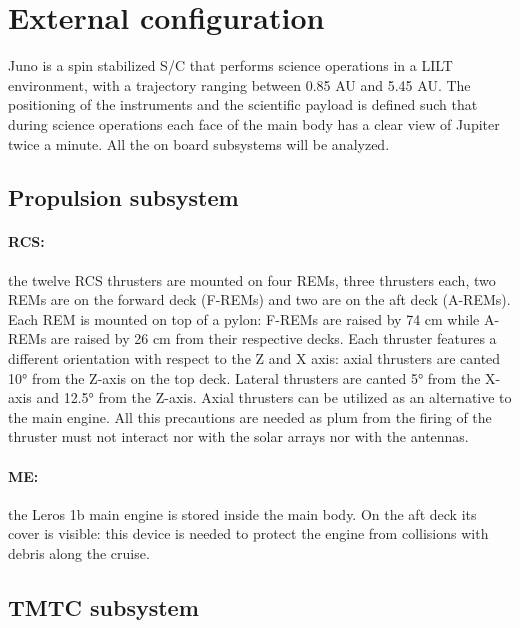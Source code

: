\section{External configuration}
\label{sec:external_config}

Juno is a spin stabilized S/C that performs science operations in a LILT environment, with a trajectory ranging between 0.85 AU and 5.45 AU. The positioning of the instruments and the scientific payload is defined such that during science operations each face of the main body has a clear view of Jupiter twice a minute. All the on board subsystems will be analyzed. 

\subsection{Propulsion subsystem}
\label{subsec:prop_sub}

\paragraph{RCS:}the twelve RCS thrusters are mounted on four REMs, three thrusters each, two REMs are on the forward deck (F-REMs) and two are on the aft deck (A-REMs). 
Each REM is mounted on top of a pylon: F-REMs are raised by 74 cm while A-REMs are raised by 26 cm from their respective decks. Each thruster features a different orientation with respect to the Z and X axis: axial thrusters are canted 10° from the Z-axis on the top deck. Lateral thrusters are canted 5° from the X-axis and 12.5° from the Z-axis. Axial thrusters can be utilized as an alternative to the main engine.  
\cite{juno_inner}
All this precautions are needed as plum from the firing of the thruster must not interact nor with the solar arrays nor with the antennas.

\vspace{-4mm}

\paragraph{ME:}the Leros 1b main engine is stored inside the main body. On the aft deck its cover is visible: this device is needed to protect the engine from collisions with debris along the cruise. 

\subsection{TMTC subsystem}
\label{subsec:tmtc_sub}

